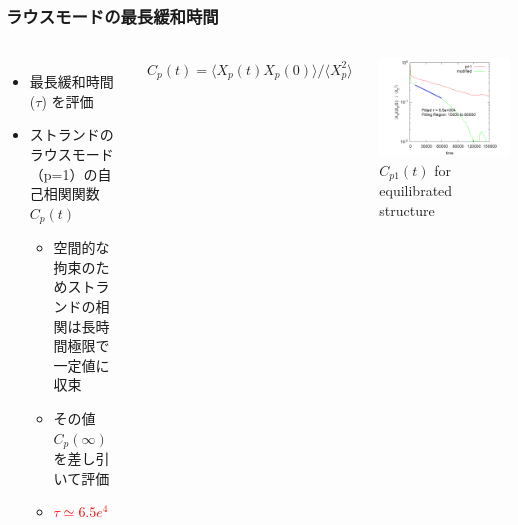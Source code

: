 \documentclass[12pt, dvipdfmx]{beamer}
\begin{document}
\begin{frame}
	\frametitle{ラウスモードの最長緩和時間}
		\begin{columns}[totalwidth=\linewidth]
			\begin{itemize}
				\item 最長緩和時間 ($\tau$) を評価
				\item ストランドのラウスモード（p=1）の自己相関関数 $C_p(t)$
				\begin{itemize}
					\item 空間的な拘束のためストランドの相関は長時間極限で一定値に収束
					\item その値 $C_p(\infty)$ を差し引いて評価
					\item \textcolor{red}{$\tau \simeq 6.5e^{4}$}
				\end{itemize}
			\end{itemize}

			\begin{align*}
				C_p(t) = \langle X_p(t)X_p(0) \rangle/\langle X_p^2 \rangle
			\end{align*}
			
				\centering
					\includegraphics[width=\textwidth]{Xp_1_org.png}\\
					$C_{p1}(t)$ for equilibrated structure

			\end{columns}
\end{frame}
\end{document}
